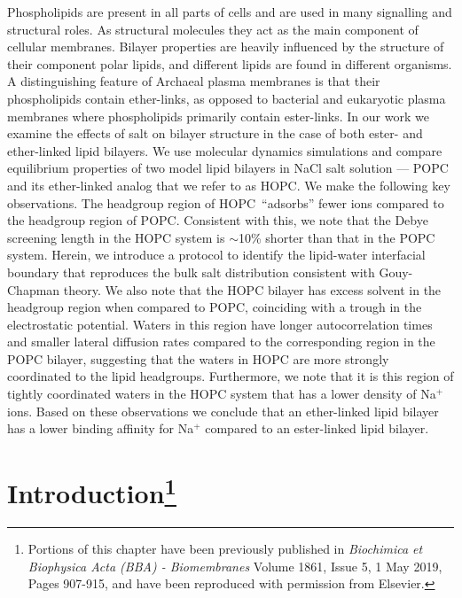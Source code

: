 \documentclass[12pt,openany,final]{book}
\newcommand{\about}{$\sim$}
\begin{document}
Phospholipids are present in all parts of cells
and are used in many signalling and structural roles.
As structural molecules they act as the main component of cellular membranes. 
Bilayer properties are heavily
influenced by the structure of their component polar lipids, and different lipids
are found in different organisms. 
A distinguishing feature of Archaeal plasma membranes is that their phospholipids contain ether-links, as opposed to bacterial and eukaryotic plasma
membranes where phospholipids primarily contain ester-links. In our work we examine the effects of
salt on bilayer structure in the case of both ester- and ether-linked lipid bilayers. 
We use molecular dynamics simulations and compare equilibrium properties of two model lipid
bilayers in NaCl salt solution --- POPC and its ether-linked analog that we refer to as HOPC. We make the following key observations.
The headgroup region of HOPC~``adsorbs'' fewer ions compared to the headgroup region of POPC. Consistent with this,
we note that the Debye screening length in the HOPC system is \about 10\% shorter than that
in the POPC system. Herein, we introduce a protocol to identify the lipid-water interfacial boundary that
reproduces the bulk salt distribution consistent with
Gouy-Chapman theory. We also note that the HOPC bilayer has excess solvent
in the headgroup region when compared to POPC,
coinciding with a trough in the electrostatic potential. Waters in
this region have longer autocorrelation times and smaller lateral diffusion rates compared to the corresponding region
in the POPC bilayer, suggesting that the waters in HOPC are more strongly
coordinated to the lipid headgroups. Furthermore, we note that it is this
region of tightly coordinated waters in the HOPC system that has a lower density of Na$^+$ ions.
Based on these observations we conclude that an ether-linked lipid bilayer has a lower binding
affinity for Na$^+$ compared to an ester-linked lipid bilayer.

\chapter[Introduction]{Introduction\footnote{
    Portions of this chapter have been previously published in \emph{Biochimica et Biophysica Acta (BBA) - Biomembranes} Volume 1861, Issue 5, 1 May 2019, Pages 907-915,
    and have been reproduced with permission from Elsevier\cite{saunders:2019}.
}}
{}
\end{document}
